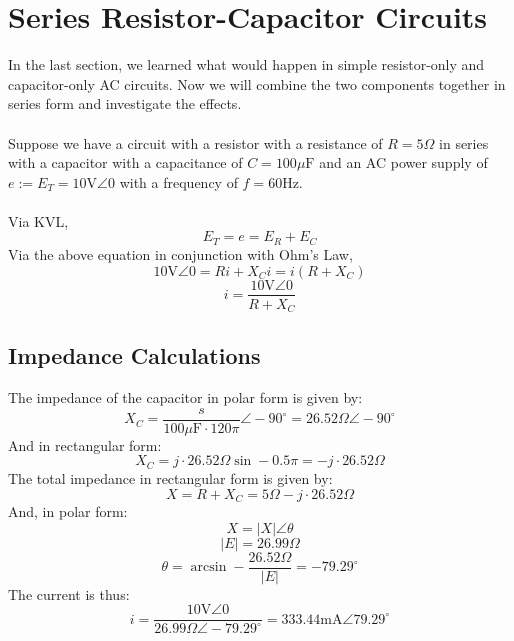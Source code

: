 \documentclass{article}
\begin{document}
	\section[In Series]{Series Resistor-Capacitor Circuits}
	In the last section, we learned what would happen in simple resistor-only 
	and capacitor-only AC circuits. Now we will combine the two components 
	together in series form and investigate the effects. \\ \\
	Suppose we have a circuit with a resistor with a resistance of $R=5\Omega$ 
	in series with a capacitor with a capacitance of $C=100\mu\text{F}$ and an 
	AC power supply of $e:=E_T=10\text{V}\angle0$ with a frequency of $f=60 
	\text{Hz}$. \\ \\
	Via KVL,
	$$ E_T = e = E_R + E_C$$
	Via the above equation in conjunction with Ohm's Law,
	$$ 10\text{V}\angle0 = Ri + X_Ci = i(R + X_C)$$
	$$ i = \frac{10\text{V}\angle0}{R + X_C}$$
	\subsection[Impedance]{Impedance Calculations}
	The impedance of the capacitor in polar form is given by:
	$$ X_C = \frac{s}{100\mu\text{F}\cdot 120 \pi} \angle -90^{\circ} = 
	26.52\Omega\angle-90^{\circ}$$
	And in rectangular form:
	$$ X_C = j\cdot 26.52\Omega\sin-0.5\pi = - j \cdot 26.52 \Omega$$
	The total impedance in rectangular form is given by:
	$$ X = R + X_C = 5\Omega - j \cdot 26.52 \Omega$$
	And, in polar form:
	$$ X = |X|\angle\theta$$
	$$ |E| = 26.99 \Omega$$
	$$ \theta = \arcsin -\frac{26.52\Omega}{|E|} = -79.29^{\circ}$$
	The current is thus:
	$$ i = 
	\frac{10\text{V}\angle0}{26.99\Omega\angle-79.29^{\circ}}=333.44\text{mA}\angle79.29^{\circ}$$
\end{document}
